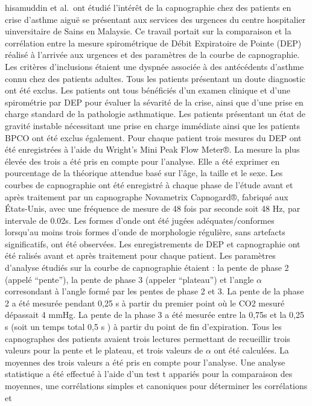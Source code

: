 \documentclass[12pt,]{article}
\begin{document}
hisamuddin et al.~ont étudié l'intérêt de la capnographie chez des
patients en crise d'asthme aiguë se présentant aux services des urgences
du centre hospitalier uinversitaire de Sains en Malaysie. Ce travail
portait sur la comparaison et la corrélation entre la mesure
spirométrique de Débit Expiratoire de Pointe (DEP) réalisé à l'arrivée
aux urgences et des paramètres de la courbe de capnographie. Les
critères d'inclusions étaient une dyspnée associée à des antécédents
d'asthme connu chez des patients adultes. Tous les patients présentant
un doute diagnostic ont été exclus. Les patients ont tous bénéficiés
d'un examen clinique et d'une spirométrie par DEP pour évaluer la
sévarité de la crise, ainsi que d'une prise en charge standard de la
pathologie asthmatique. Les patients présentant un état de gravité
instable nécessitant une prise en charge immédiate ainsi que les
patients BPCO ont été exclus également. Pour chaque patient trois
mesures du DEP ont été enregistrées à l'aide du Wright's Mini Peak Flow
Meter®. La mesure la plus élevée des trois a été pris en compte pour
l'analyse. Elle a été exprimer en pourcentage de la théorique attendue
basé sur l'âge, la taille et le sexe. Les courbes de capnographie ont
été enregistré à chaque phase de l'étude avant et après traitement par
un capnographe Novametrix Capnogard®, fabriqué aux États-Unis, avec une
fréquence de mesure de 48 fois par seconde soit 48 Hz, par intervale de
0.02s. Les formes d'onde ont été jugées adéquates/conformes lorsqu'au
moins trois formes d'onde de morphologie régulière, sans artefacts
significatifs, ont été observées. Les enregistrements de DEP et
capnographie ont été ralisés avant et après traitement pour chaque
patient. Les paramètres d'analyse étudiés sur la courbe de capnographie
étaient : la pente de phase 2 (appelé ``pente''), la pente de phase 3
(appeler ``plateau'') et l'angle \(\alpha\) corresondant à l'angle formé
par les pentes de phase 2 et 3. La pente de la phase 2 a été mesurée
pendant 0,25 s à partir du premier point où le CO2 mesuré dépassait 4
mmHg. La pente de la phase 3 a été mesurée entre la 0,75s et la 0,25 s
(soit un temps total 0,5 s ) à partir du point de fin d'expiration. Tous
les capnographes des patients avaient trois lectures permettant de
recueillir trois valeurs pour la pente et le plateau, et trois valeurs
de \(\alpha\) ont été calculées. La moyennes des trois valeurs a été
pris en compte pour l'analyse. Une analyse statistique a été effectué à
l'aide d'un test t appariés pour la comparaison des moyennes, une
corrélations simples et canoniques pour déterminer les corrélations et
\end{document}
